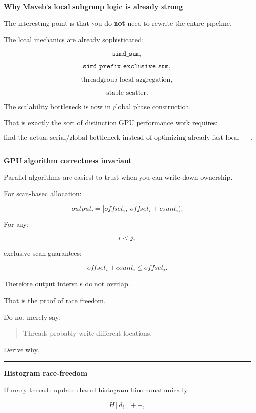 \textbf{Why Maveb's local subgroup logic is already strong}

The interesting point is that you do \textbf{not} need to rewrite the entire pipeline.

The local mechanics are already sophisticated:

\[
\texttt{simd\_sum},
\]

\[
\texttt{simd\_prefix\_exclusive\_sum},
\]

\[
\text{threadgroup-local aggregation},
\]

\[
\text{stable scatter}.
\]

The scalability bottleneck is now in global phase construction.

That is exactly the sort of distinction GPU performance work requires:

\[
\boxed{
\text{find the actual serial/global bottleneck instead of optimizing already-fast local math}.
}
\]

\begin{center}\rule{0.5\linewidth}{0.5pt}\end{center}

\textbf{GPU algorithm correctness invariant}

Parallel algorithms are easiest to trust when you can write down ownership.

For scan-based allocation:

\[
output_i
=
[offset_i,\ offset_i+count_i).
\]

For any:

\[
i<j,
\]

exclusive scan guarantees:

\[
offset_i+count_i
\le
offset_j.
\]

Therefore output intervals do not overlap.

That is the proof of race freedom.

Do not merely say:

\begin{quote}
Threads probably write different locations.
\end{quote}

Derive why.

\begin{center}\rule{0.5\linewidth}{0.5pt}\end{center}

\textbf{Histogram race-freedom}

If many threads update shared histogram bins nonatomically:

\[
H[d_i]++,
\]

